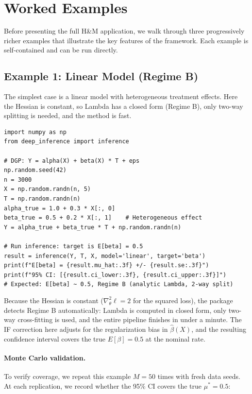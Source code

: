 \section{Worked Examples}\label{sec:examples}

Before presenting the full H\&M application, we walk through three progressively richer examples that illustrate the key features of the framework. Each example is self-contained and can be run directly.

\subsection{Example 1: Linear Model (Regime B)}

The simplest case is a linear model with heterogeneous treatment effects. Here the Hessian is constant, so Lambda has a closed form (Regime B), only two-way splitting is needed, and the method is fast.

\begin{lstlisting}
import numpy as np
from deep_inference import inference

# DGP: Y = alpha(X) + beta(X) * T + eps
np.random.seed(42)
n = 3000
X = np.random.randn(n, 5)
T = np.random.randn(n)
alpha_true = 1.0 + 0.3 * X[:, 0]
beta_true = 0.5 + 0.2 * X[:, 1]    # Heterogeneous effect
Y = alpha_true + beta_true * T + np.random.randn(n)

# Run inference: target is E[beta] = 0.5
result = inference(Y, T, X, model='linear', target='beta')
print(f"E[beta] = {result.mu_hat:.3f} +/- {result.se:.3f}")
print(f"95% CI: [{result.ci_lower:.3f}, {result.ci_upper:.3f}]")
# Expected: E[beta] ~ 0.5, Regime B (analytic Lambda, 2-way split)
\end{lstlisting}

Because the Hessian is constant ($\nabla_\theta^2 \ell = 2$ for the squared loss), the package detects Regime B automatically: Lambda is computed in closed form, only two-way cross-fitting is used, and the entire pipeline finishes in under a minute. The IF correction here adjusts for the regularization bias in $\hat{\beta}(X)$, and the resulting confidence interval covers the true $E[\beta] = 0.5$ at the nominal rate.

\paragraph{Monte Carlo validation.} To verify coverage, we repeat this example $M = 50$ times with fresh data seeds. At each replication, we record whether the 95\% CI covers the true $\mu^* = 0.5$:

